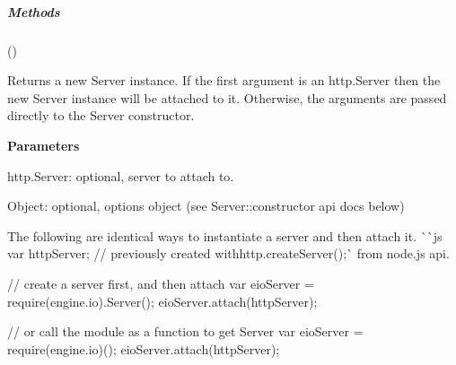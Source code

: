 \subparagraph*{Methods}


\begin{DoxyItemize}
\item {\ttfamily ()}
\begin{DoxyItemize}
\item Returns a new {\ttfamily Server} instance. If the first argument is an {\ttfamily http.\+Server} then the new {\ttfamily Server} instance will be attached to it. Otherwise, the arguments are passed directly to the {\ttfamily Server} constructor.
\item {\bfseries Parameters}
\begin{DoxyItemize}
\item {\ttfamily http.\+Server}\+: optional, server to attach to.
\item {\ttfamily Object}\+: optional, options object (see {\ttfamily Server\+::constructor} api docs below)
\end{DoxyItemize}
\end{DoxyItemize}

The following are identical ways to instantiate a server and then attach it. \`{}\`{}{\ttfamily js var http\+Server; // previously created with}http.\+create\+Server();\`{} from node.\+js api.

// create a server first, and then attach var eio\+Server = require(\textquotesingle{}engine.\+io\textquotesingle{}).Server(); eio\+Server.\+attach(http\+Server);

// or call the module as a function to get {\ttfamily Server} var eio\+Server = require(\textquotesingle{}engine.\+io\textquotesingle{})(); eio\+Server.\+attach(http\+Server);


\end{DoxyItemize}
